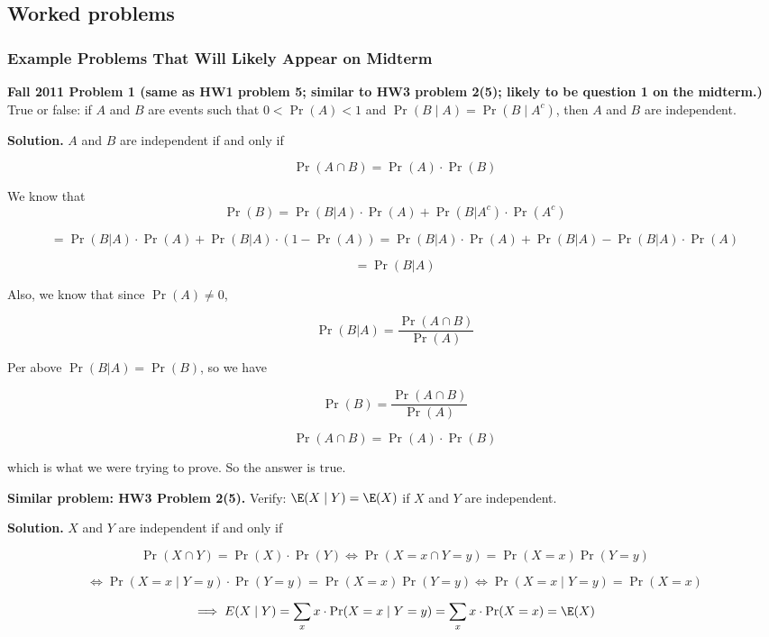 \subsection{Worked problems}

\subsubsection{Example Problems That Will Likely Appear on Midterm}

\textbf{Fall 2011 Problem 1 (same as HW1 problem 5; similar to HW3 problem 2(5); likely to be question 1 on the midterm.)} True or false: if \(A\) and \(B\) are events such that \( 0 < \Pr(A) < 1\) and \(\Pr(B \mid A) = \Pr(B \mid A^c)\), then \(A\) and \(B\) are independent.

\textbf{Solution.} \(A\) and \(B\) are independent if and only if 

\[
\Pr(A \cap B) = \Pr(A)\cdot\Pr(B)
\]

We know that \[ \Pr(B) = \Pr(B|A)\cdot \Pr(A) + \Pr(B|A^c)\cdot\Pr(A^c)  \]

\[
= \Pr(B|A)\cdot \Pr(A) + \Pr(B|A)\cdot (1 - \Pr(A)) = \Pr(B|A)\cdot \Pr(A) + \Pr(B|A) - \Pr(B|A)\cdot \Pr(A) 
\]

\[
= \Pr(B|A)
\]

Also, we know that since \(\Pr(A) \neq 0\),

\[
\Pr(B|A) = \frac{\Pr(A \cap B)}{\Pr(A)} 
\]

Per above \(\Pr(B|A) = \Pr(B)\), so we have

\[
\Pr(B) = \frac{\Pr(A \cap B)}{\Pr(A)} 
\]

\[
\Pr(A \cap B)= \Pr(A) \cdot \Pr(B)
\]

which is what we were trying to prove. So the answer is \(\boxed{\text{true.}}\)

\textbf{Similar problem: HW3 Problem 2(5).} Verify: \(\E(X \mid Y) = \E(X)\) if \(X\) and \(Y\) are independent.

\textbf{Solution.} \(X\) and \(Y\) are independent if and only if

\[
\Pr(X \cap Y) = \Pr(X)\cdot\Pr(Y) \iff \Pr(X = x \cap Y = y) = \Pr(X = x) \Pr(Y = y)
\]

\[
\iff \Pr(X = x \mid Y = y) \cdot \Pr(Y = y) =  \Pr(X = x) \Pr(Y = y) \iff \Pr(X = x \mid Y = y) = \Pr(X = x)
\]

\[
\implies E(X \mid Y) = \sum_x x \cdot \Pr(X = x \mid Y = y ) = \sum_x x \cdot \Pr(X = x ) = \E(X)
\]


